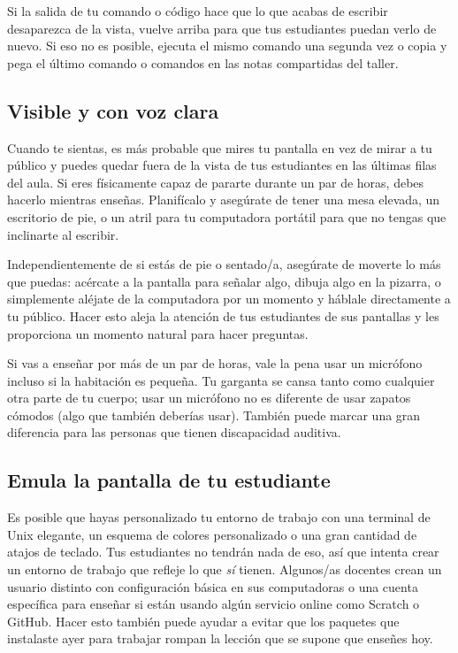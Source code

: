 Si la salida de tu comando o código hace que lo que acabas de escribir desaparezca de la vista,
vuelve arriba para que tus estudiantes puedan verlo de nuevo.
Si eso no es posible,
ejecuta el mismo comando una segunda vez
o copia y pega el último comando o comandos en las notas compartidas del taller.

\subsection*{Visible y con voz clara}

Cuando te sientas,
es más probable que mires tu pantalla en vez de mirar a tu público
y puedes quedar fuera de la vista de tus estudiantes en las últimas filas del aula.
Si eres físicamente capaz de pararte durante un par de horas,
debes hacerlo mientras enseñas.
Planifícalo y asegúrate de tener una mesa elevada,
un escritorio de pie,
o un atril
para tu computadora portátil
para que no tengas que inclinarte al escribir.

Independientemente de si estás de pie o sentado/a,
asegúrate de moverte lo más que puedas:
acércate a la pantalla para señalar algo,
dibuja algo en la pizarra,
o simplemente aléjate de la computadora por un momento y háblale directamente a tu público.
Hacer esto aleja la atención de tus estudiantes de sus pantallas
y les proporciona un momento natural para hacer preguntas.

Si vas a enseñar por más de un par de horas,
vale la pena usar un micrófono incluso si la habitación es pequeña.
Tu garganta se cansa tanto como cualquier otra parte de tu cuerpo;
usar un micrófono no es diferente de usar zapatos cómodos
(algo que también deberías usar).
También puede marcar una gran diferencia para las personas que tienen discapacidad auditiva.

\subsection*{Emula la pantalla de tu estudiante}

Es posible que hayas personalizado tu entorno de trabajo con una terminal de Unix elegante,
un esquema de colores personalizado
o una gran cantidad de atajos de teclado.
Tus estudiantes no tendrán nada de eso,
así que intenta crear un entorno de trabajo que refleje lo que \emph{sí} tienen.
Algunos/as docentes crean un usuario distinto con configuración básica en sus computadoras
o una cuenta específica para enseñar
si están usando algún servicio online como Scratch o GitHub.
Hacer esto también puede ayudar a evitar que los paquetes que instalaste ayer para trabajar
rompan la lección que se supone que enseñes hoy.

